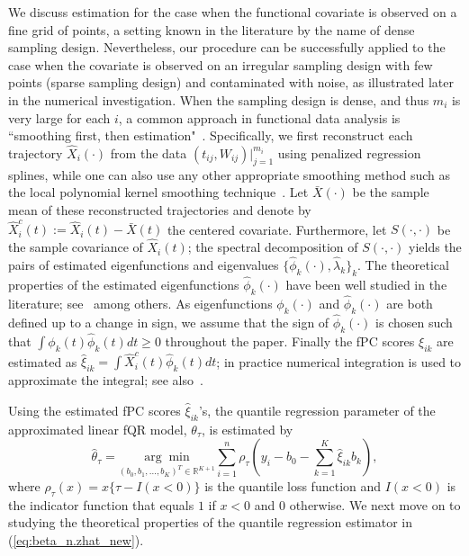 \documentclass[times,sort&compress,3p]{elsarticle}
\theoremstyle{plain}%
\theoremstyle{definition}
\newcommand{\btheta}{{\theta}}
\begin{document}
We discuss estimation for the case when the functional covariate is observed on a fine grid of points, a setting known in the literature by the name of dense sampling design. Nevertheless, our procedure can be successfully applied to the case when the covariate is observed on an irregular sampling design with few points (sparse sampling design) and contaminated with noise, as illustrated later in the numerical investigation. When the sampling design is dense, and thus $m_i$ is very large for each $i$, a common approach in functional data analysis is ``smoothing first, then estimation"~\citep{Zhang+Chen:07}.
{%
Specifically, we first reconstruct each trajectory $\widehat X_i(\cdot)$ from the data $(t_{ij}, W_{ij})|_{j=1}^{m_i}$ using penalized regression splines, while one can also use any other appropriate smoothing method such as the local polynomial kernel smoothing technique~\citep{Fan+Gijbels:96}. 
}Let $\bar X(\cdot)$ be the sample mean of these reconstructed trajectories and denote by $\widehat X_i^c(t) := \widehat X_i(t) -\bar X(t)$ the centered covariate. Furthermore, let $S(\cdot, \cdot)$ be the sample covariance of $\widehat X_i(t)$; the spectral decomposition of $S(\cdot, \cdot)$ yields the pairs of estimated eigenfunctions and eigenvalues $\{ \widehat \phi_k(\cdot), \widehat \lambda_k\}_k$. The theoretical properties of the estimated eigenfunctions $\widehat \phi_k(\cdot)$ have been well studied in the literature; see~\cite{Hal+Hos:06, Hall+:06, Zhang+Chen:07} among others. 
{%
As eigenfunctions $\phi_k(\cdot)$ and $\widehat{\phi}_k(\cdot)$ are both defined up to a change in sign, we assume that the sign of $\widehat{\phi}_k(\cdot)$  is chosen such that $\int \phi_k(t) \widehat{\phi}_k(t) dt \geq 0$ throughout the paper.}
Finally the fPC scores $\xi_{ik}$ are estimated as $\widehat{\xi}_{ik} = \int \widehat{X}_i^c(t) \widehat{\phi}_k(t)dt$; in practice numerical integration is used to approximate the integral; see also~\cite{Li+:2010}. 

Using the estimated fPC scores $\widehat \xi_{ik}$'s, the quantile regression parameter of the approximated linear fQR model, ${\btheta}_{\tau}$, %
is estimated by 
%
\begin{equation}\label{eq:beta_n.zhat_new}
\widehat{\btheta}_{\tau} = \underset{(b_0, b_1, \ldots, b_K)^T \in \mathbb{R}^{K+1}}{\arg \min} \sum_{i = 1}^n \rho_\tau\left (y_i - b_0 - \sum_{k=1}^K \widehat \xi_{ik} b_k \right ),
\end{equation}
%
where $\rho_{\tau}(x)=x\{\tau-I(x<0) \}$ is the quantile loss function and $I(x<0)$ is the indicator function that equals $1$ if $x<0$ and $0$ otherwise. {\color{black}{Although throughout this article we focus on a homogeneous truncation level $K$ to ease presentation, the proposed method easily generalizes to the case in which $K$ varies with $\tau$.}} We next move on to studying the theoretical properties of the quantile regression estimator in (\ref{eq:beta_n.zhat_new}). %
\end{document}
